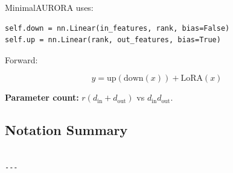 MinimalAURORA uses:

\begin{lstlisting}
self.down = nn.Linear(in_features, rank, bias=False)
self.up = nn.Linear(rank, out_features, bias=True)
\end{lstlisting}

Forward:

\[
y = \text{up}(\text{down}(x)) + \text{LoRA}(x)
\tag{3.6}
\]

\textbf{Parameter count:} $r(d_\text{in} + d_\text{out})$ vs $d_\text{in} d_\text{out}$.

\subsection{Notation Summary}

\begin{lstlisting}

---
\end{lstlisting}